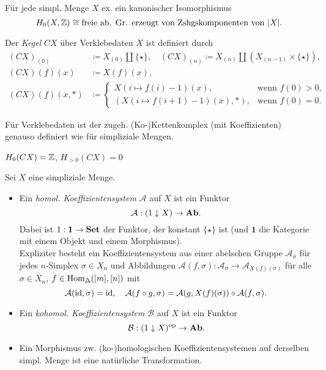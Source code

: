 \documentclass{cheat-sheet}
\begin{document}
\begin{prop}
  Für jede simpl. Menge $X$ ex. ein kanonischer Isomorphismus
  \[ H_0(X, \mathbb{Z}) \cong \text{freie ab. Gr. erzeugt von Zshgskomponenten von $\lvert X\rvert$}. \]
\end{prop}

\begin{defn}
  Der \emph{Kegel} $CX$ über Verklebedaten $X$ ist definiert durch
  \begin{align*}
    (CX)_{(0)} & \coloneqq X_{(0)} \amalg \{ \star \}, \quad (CX)_{(n)} \coloneqq X_{(n)} \amalg (X_{(n-1)} \times \{ \star \}), \\
    (CX)(f)(x) & \coloneqq X(f)(x), \\
    (CX)(f)(x,*) &  \coloneqq \begin{cases}
      X(i \mapsto f(i) - 1)(x), & \text{wenn $f(0) > 0$,} \\
      (X(i \mapsto f(i{+}1) - 1)(x), *), & \text{wenn $f(0) = 0$.}
    \end{cases}
  \end{align*}
\end{defn}

\begin{defn}
  Für Verklebedaten ist der zugeh. (Ko-)Kettenkomplex (mit Koeffizienten) genauso definiert wie für simpliziale Mengen.
\end{defn}

\begin{prop}
  $H_0(CX) = \mathbb{Z}$, $H_{>0}(CX) = 0$
\end{prop}



\begin{defn}
  Sei $X$ eine simpliziale Menge.
  \begin{itemize}
    \item Ein \emph{homol. Koeffizientensystem} $\mathcal{A}$ auf $X$ ist ein Funktor
    \[ \mathcal{A} : (1 \downarrow X) \to \mathbf{Ab}. \]
    Dabei ist $1 : \mathbf{1} \to \mathbf{Set}$ der Funktor, der konstant $\{ \star \}$ ist (und $\mathbf{1}$ die Kategorie mit einem Objekt und einem Morphismus).\\
    Expliziter besteht ein Koeffizientensystem aus einer abelschen Gruppe $\mathcal{A}_\sigma$ für jedes $n$-Simplex $\sigma \in X_n$ und Abbildungen $\mathcal{A}(f, \sigma) : \mathcal{A}_\sigma \to \mathcal{A}_{X(f)(\sigma)}$ für alle $\sigma \in X_n$, $f \in \operatorname{Hom}_{\Delta}([m], [n])$ mit
    \[
      \mathcal{A}(\operatorname{id}, \sigma) = \operatorname{id}, \quad
      \mathcal{A}(f \circ g, \sigma) = \mathcal{A}(g, X(f)(\sigma)) \circ \mathcal{A}(f, \sigma).
    \]
    \item Ein \emph{kohomol. Koeffizientensystem} $\mathcal{B}$ auf $X$ ist ein Funktor
    \[ \mathcal{B} : (1 \downarrow X)^{\mathrm{op}} \to \mathbf{Ab}. \]
    \item Ein Morphismus zw. (ko-)homologischen Koeffizientensystemen auf derselben simpl. Menge ist eine natürliche Transformation.
  \end{itemize}
\end{defn}
\end{document}
